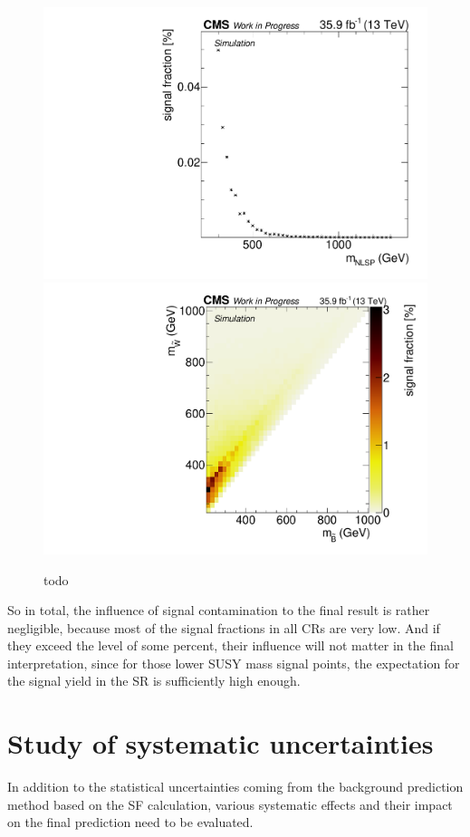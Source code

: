 \begin{figure}
 \includegraphics[width=\pairwidth]{figures/contamination/tching_DY}
 \includegraphics[width=\pairwidth]{figures/contamination/gmsb_WZ}
 \caption{todo}
 \label{fig:signalCont}
\end{figure}
So in total, the influence of signal contamination to the final result is rather negligible, because most of the signal fractions in all CRs are very low. And if they exceed the level of some percent, their influence will not matter in the final interpretation, since for those lower SUSY mass signal points, the expectation for the signal yield in the SR is sufficiently high enough.


\section{Study of systematic uncertainties}\label{sec:Syst}
In addition to the statistical uncertainties coming from the background prediction method based on the SF calculation, various systematic effects and their impact on the final prediction need to be evaluated.

